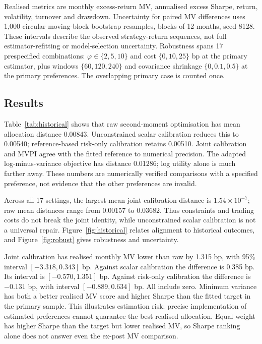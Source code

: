 \documentclass[sigconf,anonymous,review,pbalance]{acmart}
\begin{document}
Realised metrics are monthly excess-return MV, annualised excess Sharpe, return, volatility, turnover and drawdown. Uncertainty for paired MV differences uses 1,000 circular moving-block bootstrap resamples, blocks of 12 months, seed 8128. These intervals describe the observed strategy-return sequences, not full estimator-refitting or model-selection uncertainty. Robustness spans 17 prespecified combinations: $\varphi\in\{2,5,10\}$ and cost $\{0,10,25\}$ bp at the primary estimator, plus windows $\{60,120,240\}$ and covariance shrinkage $\{0,0.1,0.5\}$ at the primary preferences. The overlapping primary case is counted once.

\begin{table}[t]
\centering
\caption{Primary historical comparison, 1990--2025. Distance and fitted regret use common states; realised metrics use each strategy's own path. Gap and MV score are monthly basis-point units. Calibration improves model alignment; the table does not establish superior investment performance.}
\label{tab:historical}

\end{table}

\subsection{Results}
Table~\ref{tab:historical} shows that raw second-moment optimisation has mean allocation distance 0.00843. Unconstrained scalar calibration reduces this to 0.00540; reference-based risk-only calibration retains 0.00510. Joint calibration and MVPI agree with the fitted reference to numerical precision. The adapted log-minus-variance objective has distance 0.01286; log utility alone is much farther away. These numbers are numerically verified comparisons with a specified preference, not evidence that the other preferences are invalid.

Across all 17 settings, the largest mean joint-calibration distance is $1.54\times10^{-7}$; raw mean distances range from 0.00157 to 0.03682. Thus constraints and trading costs do not break the joint identity, while unconstrained scalar calibration is not a universal repair. Figure~\ref{fig:historical} relates alignment to historical outcomes, and Figure~\ref{fig:robust} gives robustness and uncertainty.

Joint calibration has realised monthly MV lower than raw by 1.315 bp, with 95\% interval $[-3.318,0.343]$ bp. Against scalar calibration the difference is 0.385 bp. Its interval is $[-0.570,1.351]$ bp. Against risk-only calibration the difference is $-0.131$ bp, with interval $[-0.889,0.634]$ bp. All include zero. Minimum variance has both a better realised MV score and higher Sharpe than the fitted target in the primary sample. This illustrates estimation risk: precise implementation of estimated preferences cannot guarantee the best realised allocation. Equal weight has higher Sharpe than the target but lower realised MV, so Sharpe ranking alone does not answer even the ex-post MV comparison.
\end{document}
